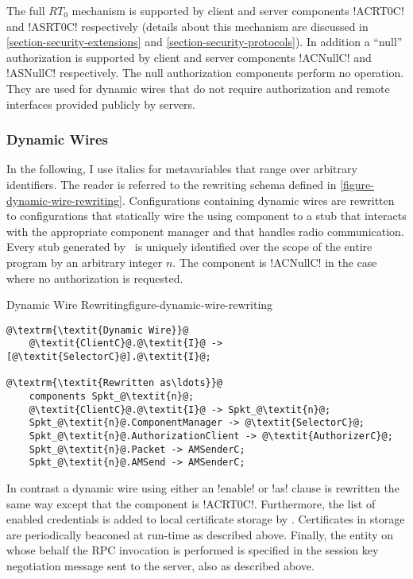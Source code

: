 The full $RT_0$ mechanism is supported by client and server components !ACRT0C! and !ASRT0C!
respectively (details about this mechanism are discussed in
\autoref{section-security-extensions} and \autoref{section-security-protocols}). In addition a
``null'' authorization is supported by client and server components !ACNullC! and !ASNullC!
respectively. The null authorization components perform no operation. They are used for dynamic
wires that do not require authorization and remote interfaces provided publicly by servers.

\subsubsection{Dynamic Wires} In the following, I use italics for metavariables that range over
arbitrary identifiers. The reader is referred to the rewriting schema defined in
\autoref{figure-dynamic-wire-rewriting}. Configurations containing dynamic wires are rewritten
to configurations that statically wire the using component  to a stub
 that interacts with the appropriate component manager
 and that handles radio communication. Every stub generated by
\Sprocket\ is uniquely identified over the scope of the entire program by an arbitrary integer
$n$. The  component is !ACNullC! in the case where no authorization
is requested.

\begin{fpfig}[t]{Dynamic Wire Rewriting}{figure-dynamic-wire-rewriting}
{
\singlespace
\begin{lstlisting}[escapechar=@]
@\textrm{\textit{Dynamic Wire}}@
    @\textit{ClientC}@.@\textit{I}@ -> [@\textit{SelectorC}@].@\textit{I}@;

@\textrm{\textit{Rewritten as\ldots}}@
    components Spkt_@\textit{n}@;
    @\textit{ClientC}@.@\textit{I}@ -> Spkt_@\textit{n}@;
    Spkt_@\textit{n}@.ComponentManager -> @\textit{SelectorC}@;
    Spkt_@\textit{n}@.AuthorizationClient -> @\textit{AuthorizerC}@;
    Spkt_@\textit{n}@.Packet -> AMSenderC;
    Spkt_@\textit{n}@.AMSend -> AMSenderC;
\end{lstlisting}
\primaryspacing
}
\end{fpfig}

In contrast a dynamic wire using either an !enable! or !as! clause is rewritten the same way
except that the  component is !ACRT0C!. Furthermore, the list of
enabled credentials is added to local certificate storage by \Sprocket. Certificates in storage
are periodically beaconed at run-time as described above. Finally, the entity on whose behalf
the RPC invocation is performed is specified in the session key negotiation message sent to the
server, also as described above.


